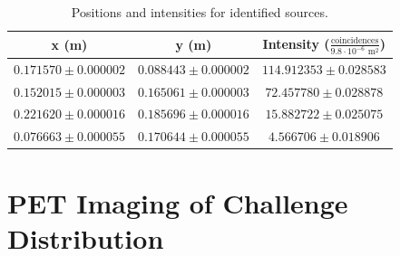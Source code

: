 \documentclass[12pt, letterpaper]{article}
\begin{document}
\begin{table}[]
    \centering
    \begin{tabular}{| c | c | c |}
        \hline
        x (m) & y (m) & Intensity ($\frac{\text{coincidences}}{9.8 \cdot 10^{-6} \text{ m}^2}$) \\
        \hline
        $0.171570 \pm 0.000002$ & $0.088443 \pm 0.000002$ & $114.912353 \pm 0.028583$ \\
        $0.152015 \pm 0.000003$ & $0.165061 \pm 0.000003$ & $72.457780 \pm 0.028878$ \\
        $0.221620 \pm 0.000016$ & $0.185696 \pm 0.000016$ & $15.882722 \pm 0.025075$ \\
        $0.076663 \pm 0.000055$ & $0.170644 \pm 0.000055$ & $4.566706 \pm 0.018906$ \\
        \hline
    \end{tabular}
    \caption{Positions and intensities for identified sources. }
    \label{tab:unknown_positions}
\end{table}

\section{PET Imaging of Challenge Distribution}
\end{document}
